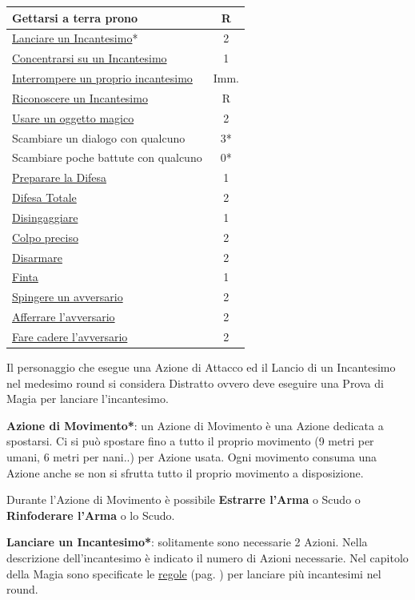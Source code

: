 \begin{multicols}{2}
\begin{tabular}{lc}
Gettarsi a terra prono& R\\
\midrule
\hyperlink{magietempodilancio}{Lanciare un Incantesimo}*& 2\\
\hyperlink{magieconcentrazione}{Concentrarsi su un Incantesimo}& 1\\
\hyperlink{magiedurata}{Interrompere un proprio incantesimo} & Imm.\\
\hyperlink{riconoscereincantesimo}{Riconoscere un Incantesimo}& R\\
\hyperlink{regoleoggettimagici}{Usare un oggetto magico}& 2\\
\midrule
Scambiare un dialogo con qualcuno& 3*\\
Scambiare poche battute con qualcuno& 0*\\
\midrule
\hyperlink{preparareladifesa}{Preparare la Difesa} & 1\\
\hyperlink{difesatotale}{Difesa Totale} & 2\\
\hyperlink{disingaggiare}{Disingaggiare} & 1\\
\hyperlink{colpopreciso}{Colpo preciso} & 2\\
\midrule
\hyperlink{disarmare}{Disarmare} & 2\\
\hyperlink{finta}{Finta} & 1\\
\hyperlink{spingereavversario}{Spingere un avversario} & 2\\
\hyperlink{afferrareunavversario}{Afferrare l'avversario} & 2\\
\hyperlink{farecadereavversario}{Fare cadere l'avversario} & 2
\end{tabular}

\medskip

Il personaggio che esegue una Azione di Attacco ed il Lancio di un Incantesimo nel medesimo round si considera Distratto ovvero deve eseguire una Prova di Magia per lanciare l'incantesimo.

\textbf{Azione di Movimento*}: un Azione di Movimento è una Azione dedicata a spostarsi. Ci si può spostare fino a tutto il proprio movimento (9 metri per umani, 6 metri per nani..) per Azione usata. Ogni movimento consuma una Azione anche se non si sfrutta tutto il proprio movimento a disposizione.

Durante l'Azione di Movimento è possibile \textbf{Estrarre l'Arma} o Scudo o \textbf{Rinfoderare l'Arma} o lo Scudo.

\textbf{Lanciare un Incantesimo*}: solitamente sono necessarie 2 Azioni. Nella descrizione dell'incantesimo è indicato il numero di Azioni necessarie. Nel capitolo della Magia sono specificate le \hyperlink{piumagieround}{regole} (pag. \pageref{piumagieround}) per lanciare più incantesimi nel round.


\end{multicols}
